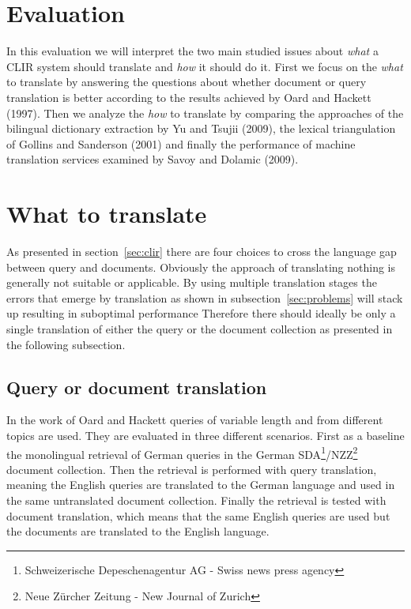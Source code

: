 \documentclass[journal]{IEEEtran}
\begin{document}
\section{Evaluation}
In this evaluation we will interpret the two main studied issues about \textit{what} a CLIR system should translate and \textit{how} it should do it.
First we focus on the \textit{what} to translate by answering the questions about whether document or query translation is better according to the results achieved by Oard and Hackett (1997).
Then we analyze the \textit{how} to translate by comparing the approaches of the bilingual dictionary extraction by Yu and Tsujii (2009), the lexical triangulation of Gollins and Sanderson (2001) and finally the performance of machine translation services examined by Savoy and Dolamic (2009).


\section*{What to translate}
As presented in section~\ref{sec:clir} there are four choices to cross the language gap between query and documents.
Obviously the approach of translating nothing is generally not suitable or applicable.
By using multiple translation stages the errors that emerge by translation as shown in subsection~\ref{sec:problems} will stack up resulting in suboptimal performance
Therefore there should ideally be only a single translation of either the query or the document collection as presented in the following subsection.

\subsection{Query or document translation}
In the work of Oard and Hackett \cite{oard97b} queries of variable length and from different topics are used.
They are evaluated in three different scenarios.
First as a baseline the monolingual retrieval of German queries in the German SDA\footnote{Schweizerische Depeschenagentur AG - Swiss news press agency}/NZZ\footnote{Neue Z\"{u}rcher Zeitung - New Journal of Zurich} document collection.
Then the retrieval is performed with query translation, meaning the English queries are translated to the German language and used in the same untranslated document collection.
Finally the retrieval is tested with document translation, which means that the same English queries are used but the documents are translated to the English language.
\end{document}
